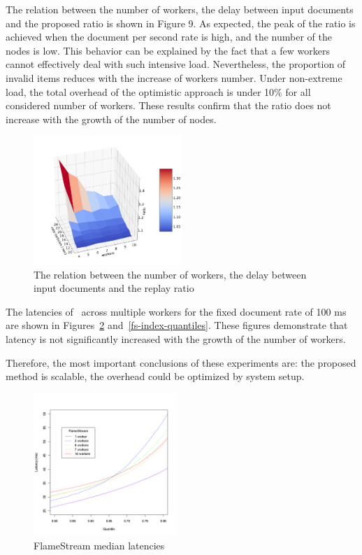 The relation between the number of workers, the delay between input documents and the proposed ratio is shown in Figure 9. As expected, the peak of the ratio is achieved when the document per second rate is high, and the number of the nodes is low. This behavior can be explained by the fact that a few workers cannot effectively deal with such intensive load. Nevertheless, the proportion of invalid items reduces with the increase of workers number. Under non-extreme load, the total overhead of the optimistic approach is under 10\% for all considered number of workers. These results confirm that the ratio does not increase with the growth of the number of nodes.

\begin{figure}[htbp]
  \centering
  \includegraphics[width=0.5\textwidth]{pics/overhead}
  \caption{The relation between the number of workers, the delay between input documents and the replay ratio}
  \label {overhead}
\end{figure}

The latencies of \FlameStream\ across multiple workers for the fixed document rate of 100 ms are shown in Figures~\ref{fs-index-median} and~\ref{fs-index-quantiles}. These figures demonstrate that latency is not significantly increased with the growth of the number of workers. 

Therefore, the most important conclusions of these experiments are: the proposed method is scalable, the overhead could be optimized by system setup.

\begin{figure}[htbp]
  \centering
  \includegraphics[width=0.48\textwidth]{pics/fs-index-median}
  \caption{FlameStream median latencies}
  \label {fs-index-median}
\end{figure}

